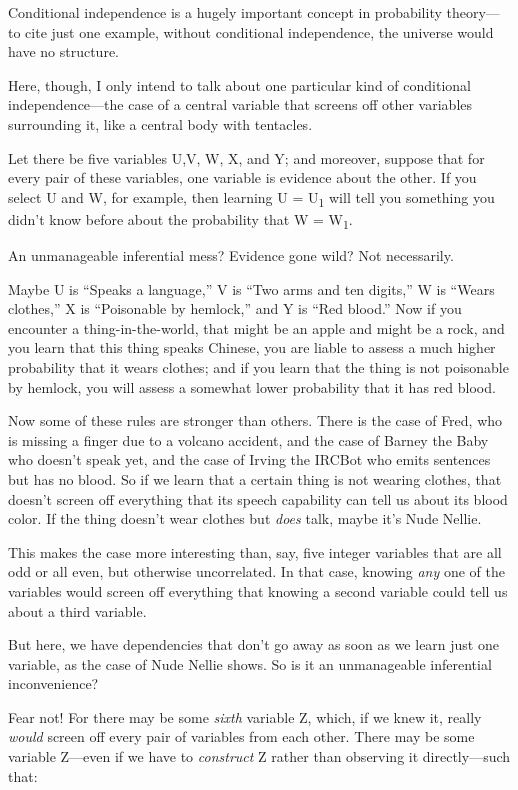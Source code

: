 {
 Conditional independence is a hugely important concept in
probability theory---to cite just one example, without conditional
independence, the universe would have no structure.}

{
 Here, though, I only intend to talk about one particular kind of
conditional independence---the case of a central variable that screens
off other variables surrounding it, like a central body with
tentacles.}

{
 Let there be five variables U,V, W, X, and Y; and moreover,
suppose that for every pair of these variables, one variable is
evidence about the other. If you select U and W, for example, then
learning U = U\textsubscript{1} will tell you something you
didn't know before about the probability that W =
W\textsubscript{1}.}

{
 An unmanageable inferential mess? Evidence gone wild? Not
necessarily.}

{
 Maybe U is ``Speaks a
language,'' V is ``Two arms and ten
digits,'' W is ``Wears
clothes,'' X is ``Poisonable by
hemlock,'' and Y is ``Red
blood.'' Now if you encounter a thing-in-the-world,
that might be an apple and might be a rock, and you learn that this
thing speaks Chinese, you are liable to assess a much higher
probability that it wears clothes; and if you learn that the thing is
not poisonable by hemlock, you will assess a somewhat lower probability
that it has red blood.}

{
 Now some of these rules are stronger than others. There is the
case of Fred, who is missing a finger due to a volcano accident, and
the case of Barney the Baby who doesn't speak yet, and
the case of Irving the IRCBot who emits sentences but has no blood. So
if we learn that a certain thing is not wearing clothes, that
doesn't screen off everything that its speech
capability can tell us about its blood color. If the thing
doesn't wear clothes but \textit{does} talk, maybe
it's Nude Nellie.}

{
 This makes the case more interesting than, say, five integer
variables that are all odd or all even, but otherwise uncorrelated. In
that case, knowing \textit{any} one of the variables would screen off
everything that knowing a second variable could tell us about a third
variable.}

{
 But here, we have dependencies that don't go away
as soon as we learn just one variable, as the case of Nude Nellie
shows. So is it an unmanageable inferential inconvenience?}

{
 Fear not! For there may be some \textit{sixth} variable Z, which,
if we knew it, really \textit{would} screen off every pair of variables
from each other. There may be some variable Z---even if we have to
\textit{construct} Z rather than observing it directly---such that:}

